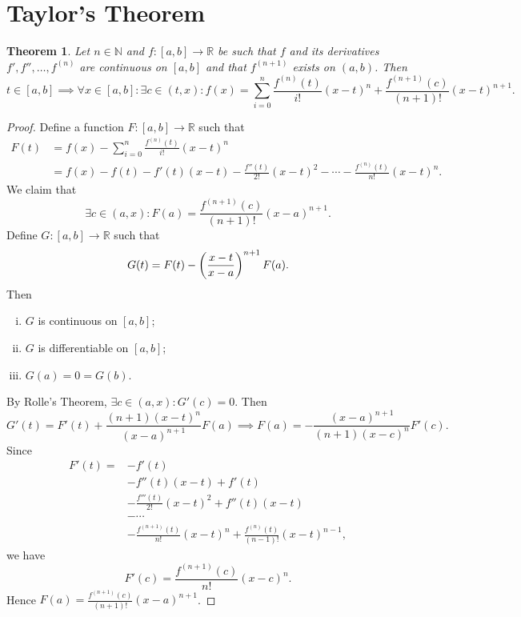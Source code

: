 \documentclass[12pt,openany]{book}
\newtheorem{theorem}{Theorem}[chapter]
\theoremstyle{definition}
\newcommand{\N}{\mathbb{N}}
\newcommand{\R}{\mathbb{R}}
\begin{document}
	\section{Taylor's Theorem}
	
	
	\begin{tcolorbox}[colback=white,colframe=thmcolor,arc=5pt,title={\color{white}\bf $\star$ Talyor's Theorem $\star$}]
		\begin{theorem}
			Let $n\in\N$ and $f:[a,b]\to\R$ be such that $f$ and its derivatives $f',f'',\dots,f^{(n)}$ are continuous on $[a,b]$ and that $f^{(n+1)}$ exists on $(a,b)$. Then \[
			t\in[a,b]\implies\forall x\in[a,b]:\exists c\in(t,x):f(x)=\sum_{i=0}^{n}\frac{f^{(n)}(t)}{i!}(x-t)^n+\frac{f^{(n+1)}(c)}{(n+1)!}(x-t)^{n+1}.
			\]
		\end{theorem}
	\end{tcolorbox}
	\begin{proof}
		Define a function $F:[a,b]\to\R$ such that \begin{align*}
			F(t)&=f(x)-\sum_{i=0}^{n}\frac{f^{(n)}(t)}{i!}(x-t)^n\\
			&=f(x)-f(t)-f'(t)(x-t)-\frac{f''(t)}{2!}(x-t)^2-\cdots-\frac{f^{(n)}(t)}{n!}(x-t)^n.
		\end{align*} We claim that \[
		\exists c\in(a,x):F(a)=\frac{f^{(n+1)}(c)}{(n+1)!}(x-a)^{n+1}.
		\] Define $G:[a,b]\to\R$ such that \[
		G(t)=F(t)-\del{\frac{x-t}{x-a}}^{n+1}F(a).
		\] Then \begin{enumerate}[(i)]
			\item $G$ is continuous on $[a,b]$;
			\item $G$ is differentiable on $[a,b]$;
			\item $G(a)=0=G(b)$.
		\end{enumerate} By Rolle's Theorem, $
		\exists c\in(a,x):G'(c)=0.$ Then \[
		G'(t)=F'(t)+\frac{(n+1)(x-t)^n}{(x-a)^{n+1}}F(a)\implies F(a)=-\frac{(x-a)^{n+1}}{(n+1)(x-c)^n}F'(c).
		\] Since
		\begin{align*}
			F'(t)=&-f'(t)\\
			&-f''(t)(x-t)+f'(t)\\
			&-\frac{f'''(t)}{2!}(x-t)^2+f''(t)(x-t)\\
			&-\cdots\\
			&-\frac{f^{(n+1)}(t)}{n!}(x-t)^n+\frac{f^{(n)}(t)}{(n-1)!}(x-t)^{n-1},
		\end{align*} we have \[
		F'(c)=\frac{f^{(n+1)}(c)}{n!}(x-c)^n.
		\] Hence $\displaystyle F(a)=\frac{f^{(n+1)}(c)}{(n+1)!}(x-a)^{n+1}$.
	\end{proof}
\end{document}
